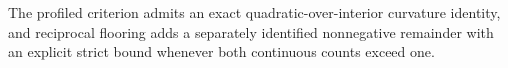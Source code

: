 The profiled criterion admits an exact quadratic-over-interior curvature identity, and reciprocal flooring adds a separately identified nonnegative remainder with an explicit strict bound whenever both continuous counts exceed one.